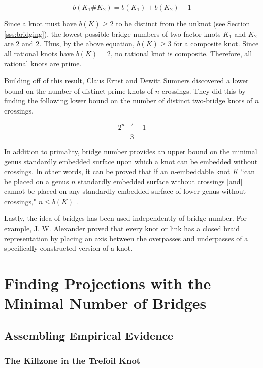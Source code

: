 \documentclass[titlepage]{article}
\newcommand{\dq}[4][]{``#2"#1 \cite[#4]{#3}.}
\begin{document}
\begin{equation*}
    b(K_1\#K_2) = b(K_1)+b(K_2)-1
\end{equation*}

Since a knot must have $b(K)\geq 2$ to be distinct from the unknot (see Section \ref{sss:bridging}), the lowest possible bridge numbers of two factor knots $K_1$ and $K_2$ are 2 and 2. Thus, by the above equation, $b(K)\geq 3$ for a composite knot. Since all rational knots have $b(K)=2$, no rational knot is composite. Therefore, all rational knots are prime.\par
Building off of this result, Claus Ernst and Dewitt Sumners discovered a lower bound on the number of distinct prime knots of $n$ crossings. They did this by finding the following lower bound on the number of distinct two-bridge knots of $n$ crossings.

\begin{equation*}
    \frac{2^{n-2}-1}{3}
\end{equation*}

In addition to primality, bridge number provides an upper bound on the minimal genus standardly embedded surface upon which a knot can be embedded without crossings. In other words, it can be proved that if an $n$-embeddable knot $K$ \dq[ $n\leq b(K)$]{can be placed on a genus $n$ standardly embedded surface without crossings [and] cannot be placed on any standardly embedded surface of lower genus without crossings,}{bib:knotbook}{114}\par
Lastly, the idea of bridges has been used independently of bridge number. For example, J. W. Alexander proved that every knot or link has a closed braid representation by placing an axis between the overpasses and underpasses of a specifically constructed version of a knot.
\newpage



\section{Finding Projections with the Minimal Number of Bridges}
\subsection{Assembling Empirical Evidence}\label{sss:evidence}
\subsubsection{The Killzone in the Trefoil Knot}
\end{document}
